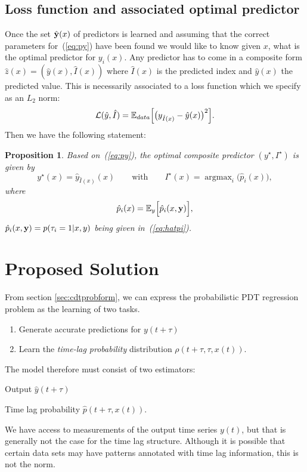 \documentclass[envcountsect,runningheads]{llncs}
\theoremstyle{etoile}
\newtheorem{prop}{Proposition}[section]
\DeclareMathOperator*{\argmax}{argmax}
\begin{document}
\subsection{Loss function and associated optimal predictor}
Once the set $\hat {\bf y}(x)$ of predictors is learned and assuming that the correct parameters for~(\ref{eq:py}) have been found
we would like to know given $x$, what is the optimal predictor for $y_i(x)$. Any predictor has  to come in a composite form
$\hat z(x) = (\hat y(x),\hat I(x))$ where $\hat I(x)$ is the predicted index and $\hat y(x)$ the predicted value.
This is necessarily associated to a loss function 
which we specify as an $L_2$ norm:
\[
{\cal L}(\hat y,\hat I) = {\mathbb E}_{data}\Bigl[\bigl(y_{\hat I(x)}-\hat y(x)\bigr)^2\Bigr]. 
\]
Then we have the following statement:
\begin{prop}
Based on~(\ref{eq:py}), the optimal composite predictor $(y^\star,I^\star)$ is given by
\[
y^\star(x) = \hat y_{\hat I(x)}(x)\qquad\text{with}\qquad I^\star(x) = \argmax_{i} \bigl(\hat p_i(x)\bigr), 
\]
where
\[
\hat p_i(x) = {\mathbb E}_y\Bigl[\hat p_i(x,{\bf y})\Bigr],
\]
$\hat p_i(x,{\bf y}) = p(\tau_i=1\vert x,y)$ being given in~(\ref{eq:hatpi}). 
\end{prop}







\section{Proposed Solution}\label{sec:model}

From section \ref{sec:cdtprobform}, we can express the probabilistic PDT regression 
problem as the learning of two tasks.

\begin{enumerate}
    \item Generate accurate predictions for $y(t + \tau)$
    \item Learn the \emph{time-lag probability} distribution $\rho(t + \tau, \tau, x(t))$.
\end{enumerate}

The model therefore must consist of two estimators:
\begin{inparaenum}[1.]
      \item Output $\hat{y}(t + \tau)$
      \item Time lag probability $\hat{p}(t + \tau, x(t))$.
\end{inparaenum} 
We have access to measurements of the output time series $y(t)$, but that is 
generally not the case for the time lag structure. Although it is possible 
that certain data sets may have patterns annotated with time lag information, 
this is not the norm.
\end{document}
